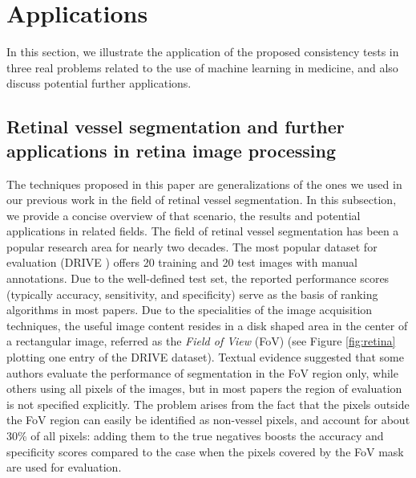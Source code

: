 \documentclass[3p, times]{elsarticle}
\begin{document}
\section{Applications}
\label{sec:applications}

In this section, we illustrate the application of the proposed consistency tests in three real problems related to the use of machine learning in medicine, and also discuss potential further applications.

\subsection{Retinal vessel segmentation and further applications in retina image processing}
\label{sec:retina}

The techniques proposed in this paper are generalizations of the ones we used in our previous work \cite{vessel} in the field of retinal vessel segmentation. In this subsection, we provide a concise overview of that scenario, the results and potential applications in related fields. 
The field of retinal vessel segmentation has been a popular research area for nearly two decades. The most popular dataset for evaluation (DRIVE \cite{drive}) offers 20 training and 20 test images with manual annotations. Due to the well-defined test set, the reported performance scores (typically accuracy, sensitivity, and specificity) serve as the basis of ranking algorithms in most papers. 
Due to the specialities of the image acquisition techniques, the useful image content resides in a disk shaped area in the center of a rectangular image, referred as the \emph{Field of View} (FoV) (see Figure \ref{fig:retina} plotting one entry of the DRIVE dataset). Textual evidence suggested that some authors evaluate the performance of segmentation in the FoV region only, while others using all pixels of the images, but in most papers the region of evaluation is not specified explicitly. The problem arises from the fact that the pixels outside the FoV region can easily be identified as non-vessel pixels, and account for about 30\% of all pixels: adding them to the true negatives boosts the accuracy and specificity scores compared to the case when the pixels covered by the FoV mask are used for evaluation.
\end{document}
